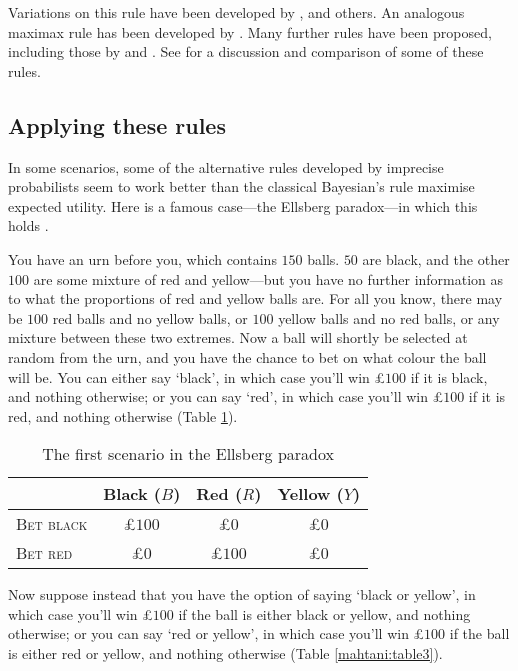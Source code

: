 Variations on this rule have been developed by \citet{gardenforssahlin1982,gilboaschmeidler1989}, and others. An analogous maximax rule has been developed by \citet{satialave1973}. Many further rules have been proposed, including those by \citet{arrowhurwicz1972} and \citet{ellsberg1961}. See \citet{troffaes2007} for a discussion and comparison of some of these rules. 


\subsection{Applying these rules}

In some scenarios, some of the alternative rules developed by imprecise probabilists seem to work better than the classical Bayesian's rule maximise expected utility. Here is a famous case---the Ellsberg paradox---in which this holds \citep{ellsberg1961}.
 
You have an urn before you, which contains $150$ balls. $50$ are black, and the other $100$ are some mixture of red and yellow---but you have no further information as to what the proportions of red and yellow balls are. For all you know, there may be $100$ red balls and no yellow balls, or $100$ yellow balls and no red balls, or any mixture between these two extremes. Now a ball will shortly be selected at random from the urn, and you have the chance to bet on what colour the ball will be. You can either say `black', in which case you'll win £$100$ if it is black, and nothing otherwise; or you can say `red', in which case you'll win £$100$ if it is red, and nothing otherwise (Table \ref{mahtani:table2}). 

\begin{table}[ht]
\centering
  \begin{tabular}{lccc}
    \hline
                       & Black ($B$) & Red ($R$) & Yellow ($Y$) \\\hline\hline
    \textsc{Bet black} & £$100$ & £$0$ & £$0$\\
    \textsc{Bet red}   & £$0$ & £$100$ & £$0$\\ 
    \hline
  \end{tabular}
\caption{The first scenario in the Ellsberg paradox}
\label{mahtani:table2}
\end{table}

Now suppose instead that you have the option of saying `black or yellow', in which case you'll win £$100$ if the ball is either black or yellow, and nothing otherwise; or you can say `red or yellow', in which case you'll win £$100$ if the ball is either red or yellow, and nothing otherwise (Table \ref{mahtani:table3}).

